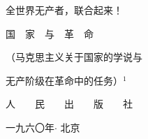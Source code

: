 
\leftskip=5mm
\small
\mbox{} \mbox{}

{\kaishu 全世界无产者，联合起来！}

\mbox{} \mbox{}

\leftskip=0mm
\begin{center}	
	\Large {}  \par 
	
	\huge{\Fheiti 国~~家~~与~~革~~命~~} \pskip
	
	\normalfont{}
	\normalsize
	
	（马克思主义关于国家的学说与\par 无产阶级在革命中的任务）$^{1}$
	
	\vfill
	
	人~~~~民~~~~出~~~~版~~~~社
	
	一九六〇年$\cdot$ 北京	
\end{center}
\thispagestyle{empty}
\clearpage